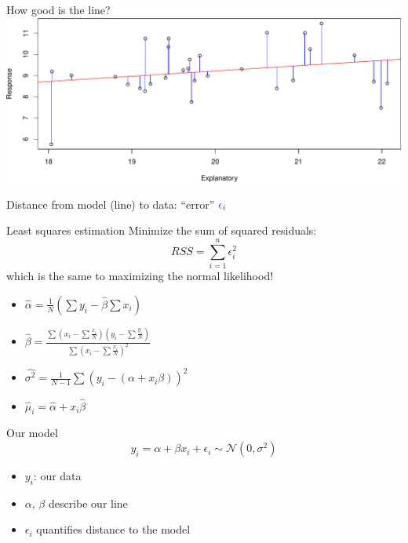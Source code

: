 \documentclass[
  ignorenonframetext,
]{beamer}
\providecommand{\tightlist}{%
  \setlength{\itemsep}{0pt}\setlength{\parskip}{0pt}}
\begin{document}
\begin{frame}{How good is the line?}
\protect\hypertarget{how-good-is-the-line}{}
\includegraphics{IntroLM_files/figure-beamer/norm-1.pdf}

Distance from model (line) to data: ``error''
\(\textcolor{blue}{\epsilon_i}\)
\end{frame}

\begin{frame}{Least squares estimation}
\protect\hypertarget{least-squares-estimation}{}
Minimize the sum of squared residuals: \begin{equation}
RSS = \sum \limits^n_{i=1} \epsilon_i^2
\end{equation} which is the same to maximizing the normal likelihood!

\begin{itemize}
\tightlist
\item
  \(\hat{\alpha}= \frac{1}{N}(\sum y_i - \hat{\beta}\sum x_i)\)
\item
  \(\hat{\beta} = \frac{\sum (x_i - \sum \frac{x_i}{N})(y_i - \sum \frac{y_i}{N})}{\sum (x_i - \sum \frac{x_i}{N})^2}\)
\item
  \(\hat{\sigma^2} = \frac{1}{N-1}\sum (y_i - (\alpha+x_i\beta))^2\)
\item
  \(\hat{\mu}_i = \hat{\alpha}+x_i\hat{\beta}\)
\end{itemize}
\end{frame}

\begin{frame}{Our model}
\protect\hypertarget{our-model}{}
\begin{equation}
y_i = \alpha + \beta x_i + \epsilon_i\sim \mathcal{N}(0,\sigma^2)
\end{equation}

\begin{itemize}
\tightlist
\item
  \(y_i\): our data
\item
  \(\alpha\), \(\beta\) describe our line
\item
  \(\epsilon_i\) quantifies distance to the model
\end{itemize}
\end{frame}
\end{document}
